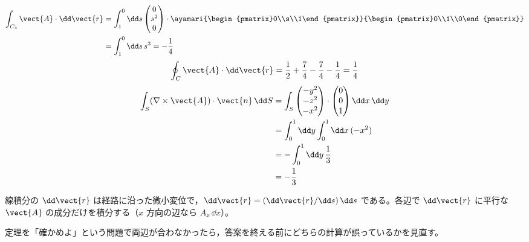 \begin{align*}
\int_{C_{4}}\vect{A}\cdot\dd\vect{r}&=\int_{1}^{0}\dd s\begin{pmatrix}0\\s^{2}\\0\end{pmatrix}\cdot\ayamari{\begin{pmatrix}0\\s\\1\end{pmatrix}}{\begin{pmatrix}0\\1\\0\end{pmatrix}}\\
&=\int_{1}^{0}\dd s\,s^{3}=-\frac{1}{4}
\end{align*}
\[ \oint_{C}\vect{A}\cdot\dd\vect{r}=\frac{1}{2}+\frac{7}{4}-\frac{7}{4}-\frac{1}{4}=\frac{1}{4} \]
\begin{align*}
\int_{S}(\nabla\times\vect{A})\cdot\vect{n}\,\dd S&=\int_{S}\begin{pmatrix}-y^{2}\\-z^{2}\\-x^{2}\end{pmatrix}\cdot\begin{pmatrix}0\\0\\1\end{pmatrix}\dd x\,\dd y\\
&=\int_{0}^{1}\dd y\int_{0}^{1}\dd x\,(-x^{2})\\
&=-\int_{0}^{1}\dd y\,\frac{1}{3}\\
&=-\frac{1}{3}
\end{align*}
\item 線積分の $\dd\vect{r}$ は経路に沿った微小変位で，$\dd\vect{r}=(\dd\vect{r}/\dd s)\,\dd s$ である。各辺で $\dd\vect{r}$ に平行な $\vect{A}$ の成分だけを積分する（$x$ 方向の辺なら $A_{x}\,\dd x$）。
\item 定理を「確かめよ」という問題で両辺が合わなかったら，答案を終える前にどちらの計算が誤っているかを見直す。
